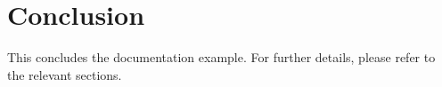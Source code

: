 \section{Conclusion}
This concludes the documentation example. For further details, please refer to the relevant sections.
